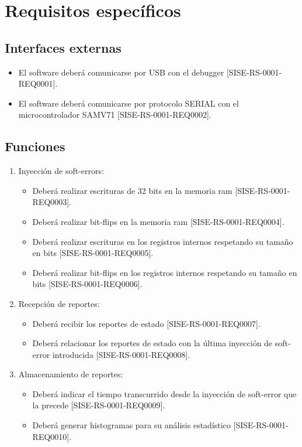 \chapter{Requisitos específicos}

\section{Interfaces externas}

\begin{itemize}
	\item El software deberá comunicarse por USB con el debugger [SISE-RS-0001-REQ0001].
	\item El software deberá comunicarse por protocolo SERIAL con el microcontrolador SAMV71 [SISE-RS-0001-REQ0002].
\end{itemize}

\section{Funciones}

\begin{enumerate}
	\item Inyección de soft-errors:
		\begin{itemize}
			\item Deberá realizar escrituras de 32 bits en la memoria ram [SISE-RS-0001-REQ0003].
			\item Deberá realizar bit-flips en la memoria ram [SISE-RS-0001-REQ0004].
			\item Deberá realizar escrituras en los registros internos respetando su tamaño en bits [SISE-RS-0001-REQ0005].
			\item Deberá realizar bit-flips en los registros internos respetando su tamaño en bits [SISE-RS-0001-REQ0006].
		\end{itemize}
	\item Recepción de reportes:
		\begin{itemize}
			\item Deberá recibir los reportes de estado [SISE-RS-0001-REQ0007].
			\item Deberá relacionar los reportes de estado con la última inyección de soft-error introducida [SISE-RS-0001-REQ0008].
		\end{itemize}
	\item Almacenamiento de reportes:
		\begin{itemize}
			\item Deberá indicar el tiempo transcurrido desde la inyección de soft-error que la precede [SISE-RS-0001-REQ0009].
			\item Deberá generar histogramas para su análisis estadístico [SISE-RS-0001-REQ0010].
		\end{itemize}
\end{enumerate}

